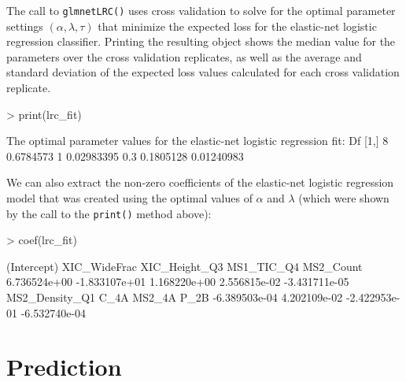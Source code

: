 \documentclass{article}
\begin{document}
\noindent The call to {\tt glmnetLRC()} uses cross validation to solve for the optimal parameter settings 
$\left(\alpha, \lambda, \tau\right)$ that minimize the expected loss for the elastic-net logistic regression 
classifier. Printing the resulting object shows the median value for the parameters over the cross validation 
replicates, as well as the average and standard deviation of the expected loss values calculated for each
cross validation replicate.
 
\begin{Schunk}
\begin{Sinput}
> print(lrc_fit)
\end{Sinput}
\begin{Soutput}
The optimal parameter values for the elastic-net logistic regression fit: 
     Df      %
[1,]  8 0.6784573     1 0.02983395 0.3         0.1805128      0.01240983
\end{Soutput}
\end{Schunk}

\noindent We can also extract the non-zero coefficients of the elastic-net logistic regression 
model that was created using the optimal values of $\alpha$ and $\lambda$ (which were shown by 
the call to the {\tt print()} method above):
\begin{Schunk}
\begin{Sinput}
> coef(lrc_fit)
\end{Sinput}
\begin{Soutput}
   (Intercept)   XIC_WideFrac  XIC_Height_Q3     MS1_TIC_Q4      MS2_Count 
  6.736524e+00  -1.833107e+01   1.168220e+00   2.556815e-02  -3.431711e-05 
MS2_Density_Q1           C_4A         MS2_4A           P_2B 
 -6.389503e-04   4.202109e-02  -2.422953e-01  -6.532740e-04 
\end{Soutput}
\end{Schunk}

\section{Prediction}
\end{document}
